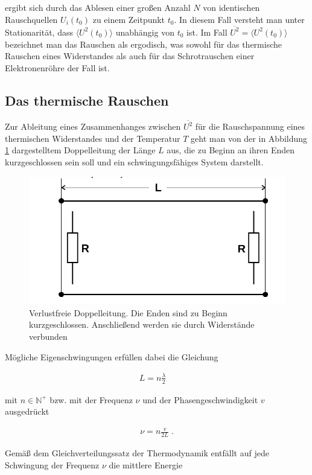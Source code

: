 ergibt sich durch das Ablesen einer großen Anzahl $N$ von identischen Rauschquellen $U_i(t_0)$ zu einem Zeitpunkt $t_0$. In diesem Fall versteht man unter Stationarität, dass $\langle U^2(t_0) \rangle$ unabhängig von $t_0$ ist. Im Fall $\overline{U^2} = \langle U^2(t_0) \rangle$ bezeichnet man das Rauschen als ergodisch, was sowohl für das thermische Rauschen eines Widerstandes als auch für das Schrotrauschen einer Elektronenröhre der Fall ist.

\subsection{Das thermische Rauschen}
Zur Ableitung eines Zusammenhanges zwischen $\overline{U^2}$ für die Rauschspannung eines thermischen Widerstandes und der Temperatur $T$ geht man von der in Abbildung \ref{FIG:doppelLeitung} dargestelltem Doppelleitung der Länge $L$ aus, die zu Beginn an ihren Enden kurzgeschlossen sein soll und ein schwingungsfähiges System darstellt.

\begin{figure}[htbp]
	\centering
	\includegraphics[width=0.5\linewidth,height=0.5\textheight,keepaspectratio]{bilder/doppelLeitung.png}
	\caption{Verlustfreie Doppelleitung. Die Enden sind zu Beginn kurzgeschlossen. Anschließend werden sie durch Widerstände verbunden \cite{Anl}}
	\label{FIG:doppelLeitung}
\end{figure}

Mögliche Eigenschwingungen erfüllen dabei die Gleichung 

\begin{align}
L = n\frac{\lambda}{2}\quad
\end{align}

mit $n \in \mathbb{N}^+$ bzw. mit der Frequenz $\nu$ und der Phasengeschwindigkeit $v$ ausgedrückt

\begin{align}
\nu = n\frac{v}{2L}\;.
\end{align}

Gemäß dem Gleichverteilungssatz der Thermodynamik entfällt auf jede Schwingung der Frequenz $\nu$ die mittlere Energie

